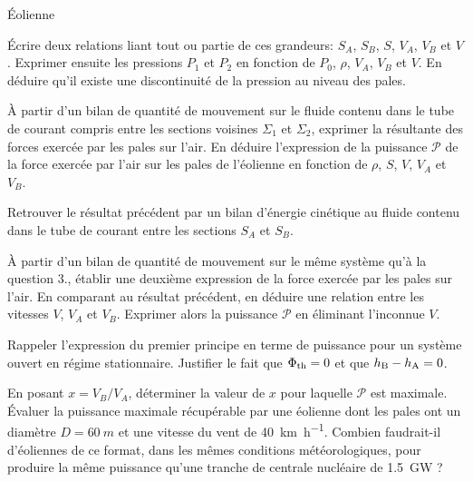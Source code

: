 \begin{exo}[PC][1][devoir]{Éolienne}
\begin{quest}
\item Écrire deux relations liant tout ou partie de ces grandeurs: $S_A$, $S_B$, $S$, $V_A$, $V_B$ et $V$. Exprimer ensuite les pressions $P_1$ et $P_2$ en fonction de $P_0$, $\rho$, $V_A$, $V_B$ et $V$. En déduire qu'il existe une discontinuité de la pression au niveau des pales.
\item À partir d'un bilan de quantité de mouvement sur le fluide contenu dans le tube de courant compris entre les sections voisines $\Sigma_1$ et $\Sigma_2$, exprimer la résultante des forces exercée par les pales sur l'air. En déduire l'expression de la puissance $\mathcal{P}$ de la force exercée par l'air sur les pales de l'éolienne en fonction de $\rho$, $S$, $V$, $V_A$ et $V_B$.
\item Retrouver le résultat précédent par un bilan d'énergie cinétique au fluide contenu dans le tube de courant entre les sections $S_A$ et $S_B$.
\item À partir d'un bilan de quantité de mouvement sur le même système qu'à la question 3., établir une deuxième expression de la force exercée par les pales sur l'air. En comparant au résultat précédent, en déduire une relation entre les vitesses $V$, $V_A$ et $V_B$. Exprimer alors la puissance $\mathcal{P}$ en éliminant l'inconnue $V$.
\item Rappeler l'expression du premier principe en terme de puissance pour un système ouvert en régime stationnaire. Justifier le fait que $\Phi_{\rm{th}}=0$ et que $h_{\rm{B}}-h_{\rm{A}}=0$.
\item En posant $x=V_B/V_A$, déterminer la valeur de $x$ pour laquelle $\mathcal{P}$ est maximale. Évaluer la puissance maximale récupérable par une éolienne dont les pales ont un diamètre $D=\SI{60}{m}$ et une vitesse du vent de \SI{40}{km.h^{-1}}. Combien faudrait-il d'éoliennes de ce format, dans les mêmes conditions météorologiques, pour produire la même puissance qu'une tranche de centrale nucléaire de \SI{1,5}{GW} ?
\end{quest}
\end{exo}


